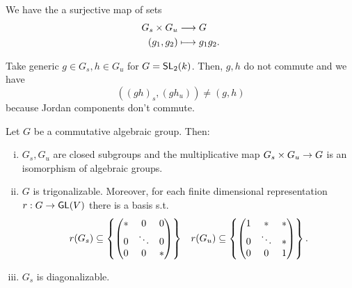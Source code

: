 We have the a surjective map of sets
\begin{align*}
G_s \times G_u & \overset{}{\longrightarrow} G\\
(g_1, g_2) & \longmapsto g_1g_2.
\end{align*}
\begin{example}
Take generic $g \in G_s, h \in G_u$ for $G=\textsf{SL}_2(k)$. Then, $g,h$ do not commute and we have
\[ ((gh)_s, (gh_u)) \neq (g, h) \]
because Jordan components don't commute.
\end{example}
\begin{theorem}
Let $G$ be a commutative algebraic group. Then:
\begin{enumerate}[(i)]
	\item $G_s, G_u$ are closed subgroups and the multiplicative map $G_s \times G_u \overset{}{\rightarrow} G$ is an isomorphism of algebraic groups.
	\item $G$ is trigonalizable. Moreover, for each finite dimensional representation $r : G \overset{}{\rightarrow} \textsf{GL}(V)$ there is a basis s.t.
	\begin{align*}
	r(G_s) \subseteq \left\lbrace\left(\begin{matrix} * & 0& 0\\
	0 & \ddots & 0\\
0 & 0 & * \end{matrix}\right)\right\rbrace && 
	r(G_u) \subseteq \left\lbrace\left(\begin{matrix} 1 & * & *\\
		0 & \ddots & *\\
		0 & 0 & 1 \end{matrix}\right)\right\rbrace.
	\end{align*}
	\item $G_s$ is diagonalizable.
\end{enumerate}
\end{theorem}
